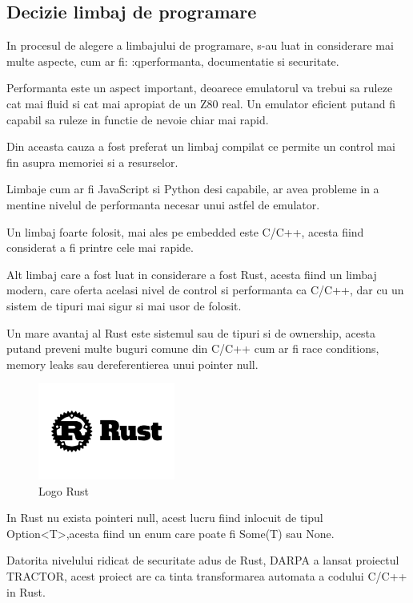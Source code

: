 \documentclass[titlepage,12pt]{article}
\begin{document}
\subsection{Decizie limbaj de programare}

In procesul de alegere a limbajului de programare, s-au luat in considerare mai multe aspecte, cum ar fi:
:qperformanta, documentatie si securitate.

Performanta este un aspect important, deoarece emulatorul va trebui sa ruleze cat mai fluid si cat mai apropiat de un Z80 real.
Un emulator eficient putand fi capabil sa ruleze in functie de nevoie chiar mai rapid.

Din aceasta cauza a fost preferat un limbaj compilat ce permite un control mai fin asupra memoriei si a resurselor.

Limbaje cum ar fi JavaScript si Python desi capabile, ar avea probleme in a mentine nivelul de performanta necesar unui astfel de emulator.

Un limbaj foarte folosit, mai ales pe embedded este C/C++, acesta fiind considerat a fi printre cele mai rapide.

Alt limbaj care a fost luat in considerare a fost Rust, acesta fiind un limbaj modern,
care oferta acelasi nivel de control si performanta ca C/C++, dar cu un sistem de tipuri mai sigur si mai usor de folosit.

Un mare avantaj al \ac {Rust} este sistemul sau de tipuri si de ownership,
acesta putand preveni multe buguri comune din C/C++ cum ar fi race conditions, memory leaks sau dereferentierea unui pointer null.

\begin{figure}
\centering
\includegraphics[width=0.4\textwidth]{images/rust_gear_logo.png}
\caption{Logo Rust}
\label{fig:rust-logo}
\end{figure}

In \ac {Rust} nu exista pointeri null, acest lucru fiind inlocuit de tipul Option<T>,acesta fiind un enum care poate fi Some(T) sau None.

Datorita nivelului ridicat de securitate adus de Rust,
\ac {DARPA} a lansat proiectul TRACTOR, acest proiect are ca tinta transformarea automata a codului C/C++ in Rust.
\end{document}
